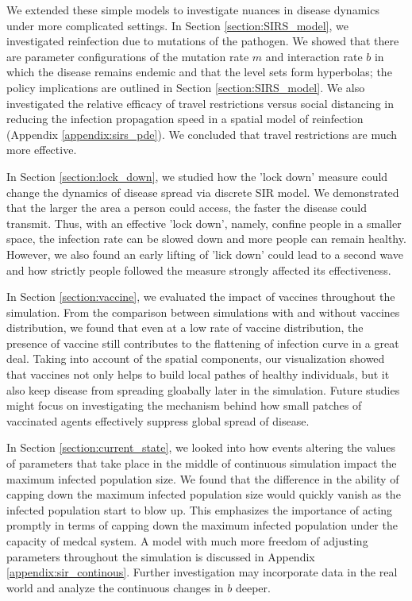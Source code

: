 \documentclass[12pt, reqno]{amsart}
\begin{document}
    We extended these simple models to investigate nuances in disease dynamics under more complicated settings. In Section \ref{section:SIRS_model}, we investigated reinfection due to mutations of the pathogen. We showed that there are parameter configurations of the mutation rate \(m\) and interaction rate \(b\) in which the disease remains endemic and that the level sets form hyperbolas; the policy implications are outlined in Section \ref{section:SIRS_model}. We also investigated the relative efficacy of travel restrictions versus social distancing in reducing the infection propagation speed in a spatial model of reinfection (Appendix \ref{appendix:sirs_pde}). We concluded that travel restrictions are much more effective.
    
    In Section \ref{section:lock_down}, we studied how the 'lock down' measure could change the dynamics of disease spread via discrete SIR model. We demonstrated that the larger the area a person could access, the faster the disease could transmit. Thus, with an effective 'lock down', namely, confine people in a smaller space, the infection rate can be slowed down and more people can remain healthy. However, we also found an early lifting of 'lick down' could lead to a second wave and how strictly people followed the measure strongly affected its effectiveness.

    In Section \ref{section:vaccine}, we evaluated the impact of vaccines throughout the simulation. From the comparison between simulations with and without vaccines distribution, we found that even at a low rate of vaccine distribution, the presence of vaccine still contributes to the flattening of infection curve in a great deal. Taking into account of the spatial components, our visualization showed that vaccines not only helps to build local pathes of healthy individuals, but it also keep disease from spreading gloabally later in the simulation. Future studies might focus on investigating the mechanism behind how small patches of vaccinated agents effectively suppress global spread of disease.

    In Section \ref{section:current_state}, we looked into how events altering the values of parameters that take place in the middle of continuous simulation impact the maximum infected population size. We found that the difference in the ability of capping down the maximum infected population size would quickly vanish as the infected population start to blow up. This emphasizes the importance of acting promptly in terms of capping down the maximum infected population under the capacity of medcal system. A model with much more freedom of adjusting parameters throughout the simulation is discussed in Appendix \ref{appendix:sir_continous}. Further investigation may incorporate data in the real world and analyze the continuous changes in $b$ deeper.
\end{document}
